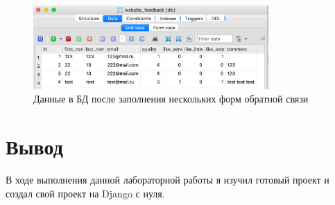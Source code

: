 \documentclass[a4paper, 14pt]{extarticle}
\begin{document}
\begin{figure}[H]
  \centering
  \includegraphics[width=0.8\textwidth]{images/database-view.png}
  \caption{Данные в БД после заполнения нескольких форм обратной связи}
  \label{fig:database-view}
\end{figure}

\section{Вывод}

В ходе выполнения данной лабораторной работы я изучил готовый проект и создал
свой проект на Django с нуля.
\end{document}
